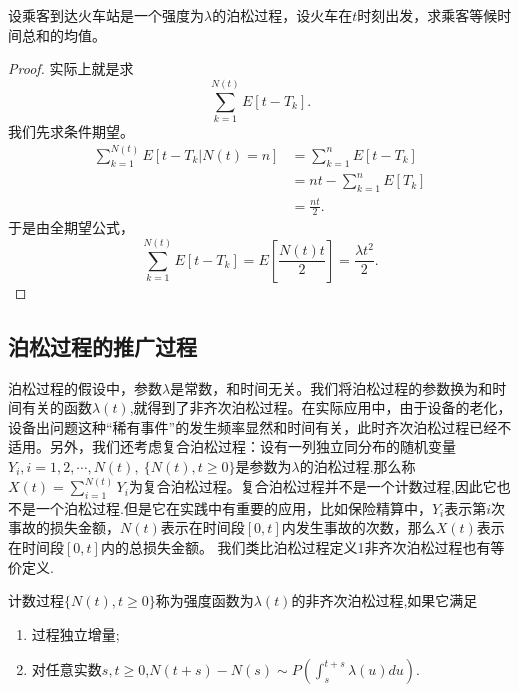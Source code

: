 \documentclass[lang=cn,10pt]{elegantbook}
\begin{document}
	\begin{example}
		设乘客到达火车站是一个强度为\(\lambda\)的泊松过程，设火车在\(t\)时刻出发，求乘客等候时间总和的均值。
	\end{example}
	\begin{proof}
		实际上就是求
		\[\sum_{k=1}^{N(t)}E[t-T_k].\]
		我们先求条件期望。
		\begin{align*}
			\sum_{k=1}^{N(t)}E[t-T_k|N(t)=n]&=\sum_{k=1}^{n}E[t-T_k]\\
			&=nt-\sum_{k=1}^{n}E[T_k]\\
			&=\frac{nt}{2}.
		\end{align*}
		于是由全期望公式，
		\[\sum_{k=1}^{N(t)}E[t-T_k]=E[\frac{N(t)t}{2}]=\frac{\lambda t^2}{2}.\]
	\end{proof}

	\subsection{泊松过程的推广过程}
	泊松过程的假设中，参数\(\lambda\)是常数，和时间无关。我们将泊松过程的参数换为和时间有关的函数\(\lambda(t)\),就得到了非齐次泊松过程。在实际应用中，由于设备的老化，设备出问题这种“稀有事件”的发生频率显然和时间有关，此时齐次泊松过程已经不适用。另外，我们还考虑复合泊松过程：设有一列独立同分布的随机变量\(Y_i,i=1,2,\cdots,N(t),\ \{N(t),t\ge 0\}\)是参数为\(\lambda\)的泊松过程.那么称\(X(t)=\sum_{i=1}^{N(t)}Y_i\)为复合泊松过程。复合泊松过程并不是一个计数过程,因此它也不是一个泊松过程.但是它在实践中有重要的应用，比如保险精算中，\(Y_i\)表示第\(i\)次事故的损失金额，\(N(t)\)表示在时间段\([0,t]\)内发生事故的次数，那么\(X(t)\)表示在时间段\([0,t]\)内的总损失金额。
	我们类比泊松过程定义1非齐次泊松过程也有等价定义.
	\begin{definition}[非齐次泊松过程1]
		计数过程\(\{N(t),t\ge0\}\)称为强度函数为\(\lambda(t)\)的非齐次泊松过程,如果它满足
		\begin{enumerate}
			\item 过程独立增量;
			\item 对任意实数\(s,t\ge 0\),\(N(t+s)-N(s)\sim P\left(\int_{s}^{t+s}\lambda(u)du\right)\).
		\end{enumerate}
	\end{definition}
\end{document}
